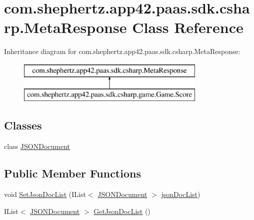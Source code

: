 \hypertarget{classcom_1_1shephertz_1_1app42_1_1paas_1_1sdk_1_1csharp_1_1_meta_response}{\section{com.\+shephertz.\+app42.\+paas.\+sdk.\+csharp.\+Meta\+Response Class Reference}
\label{classcom_1_1shephertz_1_1app42_1_1paas_1_1sdk_1_1csharp_1_1_meta_response}
}


 


Inheritance diagram for com.\+shephertz.\+app42.\+paas.\+sdk.\+csharp.\+Meta\+Response\+:\begin{figure}[H]
\begin{center}
\leavevmode
\includegraphics[height=2.000000cm]{classcom_1_1shephertz_1_1app42_1_1paas_1_1sdk_1_1csharp_1_1_meta_response}
\end{center}
\end{figure}
\subsection*{Classes}
\begin{DoxyCompactItemize}
\item 
class \hyperlink{classcom_1_1shephertz_1_1app42_1_1paas_1_1sdk_1_1csharp_1_1_meta_response_1_1_j_s_o_n_document}{J\+S\+O\+N\+Document}
\end{DoxyCompactItemize}
\subsection*{Public Member Functions}
\begin{DoxyCompactItemize}
\item 
void \hyperlink{classcom_1_1shephertz_1_1app42_1_1paas_1_1sdk_1_1csharp_1_1_meta_response_af9ed8ad5f6f400a772e34dd269d95961}{Set\+Json\+Doc\+List} (I\+List$<$ \hyperlink{classcom_1_1shephertz_1_1app42_1_1paas_1_1sdk_1_1csharp_1_1_meta_response_1_1_j_s_o_n_document}{J\+S\+O\+N\+Document} $>$ \hyperlink{classcom_1_1shephertz_1_1app42_1_1paas_1_1sdk_1_1csharp_1_1_meta_response_a24cfe8169bedb6b32fccc3bc107ab092}{json\+Doc\+List})
\item 
I\+List$<$ \hyperlink{classcom_1_1shephertz_1_1app42_1_1paas_1_1sdk_1_1csharp_1_1_meta_response_1_1_j_s_o_n_document}{J\+S\+O\+N\+Document} $>$ \hyperlink{classcom_1_1shephertz_1_1app42_1_1paas_1_1sdk_1_1csharp_1_1_meta_response_a09c8cbe21d2d3a652fafe9d15e65cb82}{Get\+Json\+Doc\+List} ()
\end{DoxyCompactItemize}
